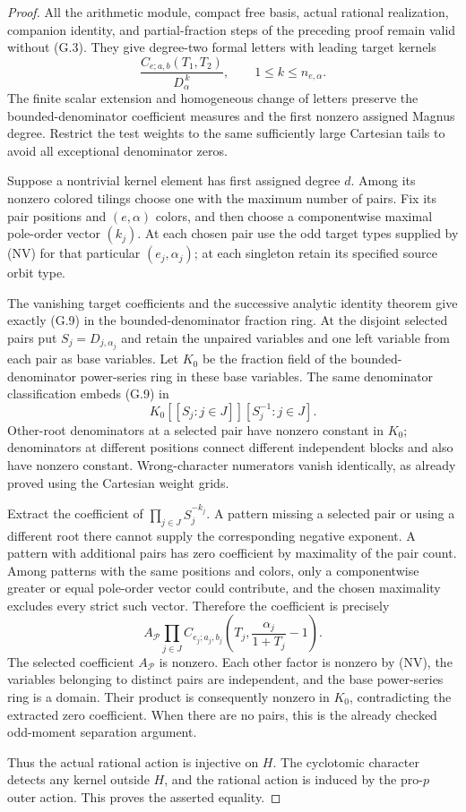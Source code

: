 \documentclass[11pt,a4paper]{article}
\theoremstyle{definition}
\begin{document}
\begin{proof}
All the arithmetic module, compact free basis, actual rational realization, companion identity, and partial-fraction steps of the preceding proof remain valid without (G.3). They give degree-two formal letters with leading target kernels
\[
 \frac{C_{e;a,b}(T_1,T_2)}{D_\alpha^{\,k}},
 \qquad 1\le k\le n_{e,\alpha}.
\]
The finite scalar extension and homogeneous change of letters preserve the bounded-denominator coefficient measures and the first nonzero assigned Magnus degree. Restrict the test weights to the same sufficiently large Cartesian tails to avoid all exceptional denominator zeros.

Suppose a nontrivial kernel element has first assigned degree $d$. Among its nonzero colored tilings choose one with the maximum number of pairs. Fix its pair positions and $(e,\alpha)$ colors, and then choose a componentwise maximal pole-order vector $(k_j)$. At each chosen pair use the odd target types supplied by (NV) for that particular $(e_j,\alpha_j)$; at each singleton retain its specified source orbit type.

The vanishing target coefficients and the successive analytic identity theorem give exactly (G.9) in the bounded-denominator fraction ring. At the disjoint selected pairs put $S_j=D_{j,\alpha_j}$ and retain the unpaired variables and one left variable from each pair as base variables. Let $K_0$ be the fraction field of the bounded-denominator power-series ring in these base variables. The same denominator classification embeds (G.9) in
\[
 K_0[[S_j:j\in J]][S_j^{-1}:j\in J].
\]
Other-root denominators at a selected pair have nonzero constant in $K_0$; denominators at different positions connect different independent blocks and also have nonzero constant. Wrong-character numerators vanish identically, as already proved using the Cartesian weight grids.

Extract the coefficient of $\prod_{j\in J}S_j^{-k_j}$. A pattern missing a selected pair or using a different root there cannot supply the corresponding negative exponent. A pattern with additional pairs has zero coefficient by maximality of the pair count. Among patterns with the same positions and colors, only a componentwise greater or equal pole-order vector could contribute, and the chosen maximality excludes every strict such vector. Therefore the coefficient is precisely
\[
 A_{\mathcal P}\prod_{j\in J}
 C_{e_j;a_j,b_j}\!\left(T_j,\frac{\alpha_j}{1+T_j}-1\right).
\]
The selected coefficient $A_{\mathcal P}$ is nonzero. Each other factor is nonzero by (NV), the variables belonging to distinct pairs are independent, and the base power-series ring is a domain. Their product is consequently nonzero in $K_0$, contradicting the extracted zero coefficient. When there are no pairs, this is the already checked odd-moment separation argument.

Thus the actual rational action is injective on $H$. The cyclotomic character detects any kernel outside $H$, and the rational action is induced by the pro-$p$ outer action. This proves the asserted equality.
\end{proof}
\end{document}
